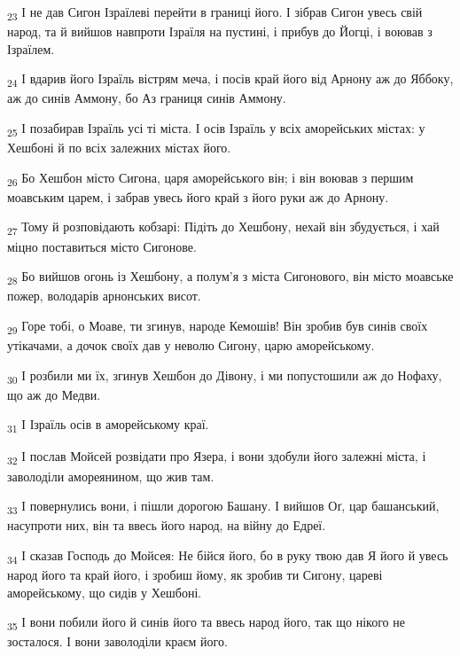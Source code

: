 \begin{tcolorbox}
\textsubscript{23} І не дав Сигон Ізраїлеві перейти в границі його. І зібрав Сигон увесь свій народ, та й вийшов навпроти Ізраїля на пустині, і прибув до Йогці, і воював з Ізраїлем.
\end{tcolorbox}
\begin{tcolorbox}
\textsubscript{24} І вдарив його Ізраїль вістрям меча, і посів край його від Арнону аж до Яббоку, аж до синів Аммону, бо Аз границя синів Аммону.
\end{tcolorbox}
\begin{tcolorbox}
\textsubscript{25} І позабирав Ізраїль усі ті міста. І осів Ізраїль у всіх аморейських містах: у Хешбоні й по всіх залежних містах його.
\end{tcolorbox}
\begin{tcolorbox}
\textsubscript{26} Бо Хешбон місто Сигона, царя аморейського він; і він воював з першим моавським царем, і забрав увесь його край з його руки аж до Арнону.
\end{tcolorbox}
\begin{tcolorbox}
\textsubscript{27} Тому й розповідають кобзарі: Підіть до Хешбону, нехай він збудується, і хай міцно поставиться місто Сигонове.
\end{tcolorbox}
\begin{tcolorbox}
\textsubscript{28} Бо вийшов огонь із Хешбону, а полум'я з міста Сигонового, він місто моавське пожер, володарів арнонських висот.
\end{tcolorbox}
\begin{tcolorbox}
\textsubscript{29} Горе тобі, о Моаве, ти згинув, народе Кемошів! Він зробив був синів своїх утікачами, а дочок своїх дав у неволю Сигону, царю аморейському.
\end{tcolorbox}
\begin{tcolorbox}
\textsubscript{30} І розбили ми їх, згинув Хешбон до Дівону, і ми попустошили аж до Нофаху, що аж до Медви.
\end{tcolorbox}
\begin{tcolorbox}
\textsubscript{31} І Ізраїль осів в аморейському краї.
\end{tcolorbox}
\begin{tcolorbox}
\textsubscript{32} І послав Мойсей розвідати про Язера, і вони здобули його залежні міста, і заволоділи амореянином, що жив там.
\end{tcolorbox}
\begin{tcolorbox}
\textsubscript{33} І повернулись вони, і пішли дорогою Башану. І вийшов Оґ, цар башанський, насупроти них, він та ввесь його народ, на війну до Едреї.
\end{tcolorbox}
\begin{tcolorbox}
\textsubscript{34} І сказав Господь до Мойсея: Не бійся його, бо в руку твою дав Я його й увесь народ його та край його, і зробиш йому, як зробив ти Сигону, цареві аморейському, що сидів у Хешбоні.
\end{tcolorbox}
\begin{tcolorbox}
\textsubscript{35} І вони побили його й синів його та ввесь народ його, так що нікого не зосталося. І вони заволоділи краєм його.
\end{tcolorbox}
